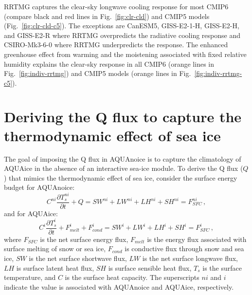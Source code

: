 \documentclass[draft]{agujournal2019}
\begin{document}
RRTMG captures the clear-sky longwave cooling response for most CMIP6 (compare black and red lines in Fig.~\ref{fig:clr-cld}) and CMIP5 models (Fig.~\ref{fig:clr-cld-c5}). The exceptions are CanESM5, GISS-E2-1-H, GISS-E2-H, and GISS-E2-R where RRTMG overpredicts the radiative cooling response and CSIRO-Mk3-6-0 where RRTMG underpredicts the response. The enhanced greenhouse effect from warming and the moistening associated with fixed relative humidity explains the clear-sky response in all CMIP6 (orange lines in Fig.~\ref{fig:indiv-rrtmg}) and CMIP5 models (orange lines in Fig.~\ref{fig:indiv-rrtmg-c5}).

\section{Deriving the Q flux to capture the thermodynamic effect of sea ice}
\label{sec:c4ab}
The goal of imposing the Q flux in AQUAnoice is to capture the climatology of AQUAice in the absence of an interactive sea-ice module. To derive the Q flux ($Q$) that mimics the thermodynamic effect of sea ice, consider the surface energy budget for AQUAnoice:
\begin{equation}\label{eq:fsfc-ni}
    C^{ni}\frac{\partial T^{ni}_{s}}{\partial t} + Q = SW^{ni} + LW^{ni} + LH^{ni} + SH^{ni} = F^{ni}_{SFC} \, ,
\end{equation}
and for AQUAice:
\begin{equation}\label{eq:fsfc-i}
    C^i\frac{\partial T^{i}_{s}}{\partial t} + F^i_{melt} + F^i_{cond}  = SW^{i} + LW^{i} + LH^{i} + SH^{i} = F^i_{SFC} \, ,
\end{equation}
where $F_{SFC}$ is the net surface energy flux, $F_{melt}$ is the energy flux associated with surface melting of snow or sea ice, $F_{cond}$ is conductive flux through snow and sea ice, $SW$ is the net surface shortwave flux, $LW$ is the net surface longwave flux, $LH$ is surface latent heat flux, $SH$ is surface sensible heat flux, $T_{s}$ is the surface temperature, and $C$ is the surface heat capacity. The superscripts $ni$ and $i$ indicate the value is associated with AQUAnoice and AQUAice, respectively.
\end{document}
